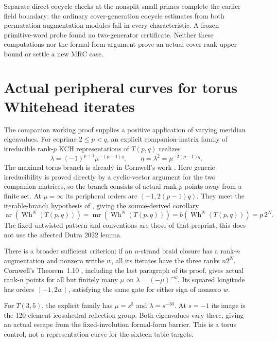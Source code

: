 \documentclass[11pt]{article}
\newcommand{\mr}{\operatorname{mr}}
\begin{document}
Separate direct cocycle checks at the nonsplit small primes complete
the earlier field boundary: the ordinary cover-generation cocycle
estimates from both permutation augmentation modules fail in every
characteristic. A frozen primitive-word probe found no two-generator
certificate. Neither these computations nor the formal-form argument
prove an actual cover-rank upper bound or settle a new MRC case.

\clearpage
\section{Actual peripheral curves for torus Whitehead iterates}

The companion working proof
 supplies a positive
application of varying meridian eigenvalues. For coprime
$2\le p<q$, an explicit companion-matrix family of irreducible
rank-$p$ KCH representations of $T(p,q)$ realizes
\[
 \lambda=(-1)^{p+1}\mu^{-(p-1)q},\qquad
 \eta=\lambda^2=\mu^{-2(p-1)q}.
\]
The maximal torus branch is already in Cornwell's work
\cite[Section~5.1]{cornwell}. Here generic irreducibility is proved
directly by a cyclic-vector argument for the two companion matrices,
so the branch consists of actual rank-$p$ points away from a finite
set. At $\mu=\infty$ its peripheral orders are $(-1,2(p-1)q)$.
They meet the iterable-branch hypothesis of
\cite[Definition~4.1 and Corollary~4.5]{whitehead}, giving the
source-derived corollary
\[
 \operatorname{ar}(\operatorname{Wh}^N(T(p,q)))
 =\mr(\operatorname{Wh}^N(T(p,q)))
 =b(\operatorname{Wh}^N(T(p,q)))=p\,2^N.
\]
The fixed untwisted pattern and conventions are those of that
preprint; this does not use the affected Dutra 2022 lemma.

There is a broader sufficient criterion: if an $n$-strand braid
closure has a rank-$n$ augmentation and nonzero writhe $w$, all
its iterates have the three ranks $n2^N$. Cornwell's
Theorem~1.10 \cite{cornwell17}, including the last paragraph of its
proof, gives actual rank-$n$ points for all but finitely many
$\mu$ on $\lambda=(-\mu)^{-w}$. Its squared longitude has orders
$(-1,2w)$, satisfying the same gate for either sign of nonzero $w$.

For $T(3,5)$, the explicit family has $\mu=s^3$ and
$\lambda=s^{-30}$. At $s=-1$ its image is the 120-element
icosahedral reflection group. Both eigenvalues vary there, giving
an actual escape from the fixed-involution formal-form barrier.
This is a torus control, not a representation curve for the sixteen
table targets.
\end{document}

